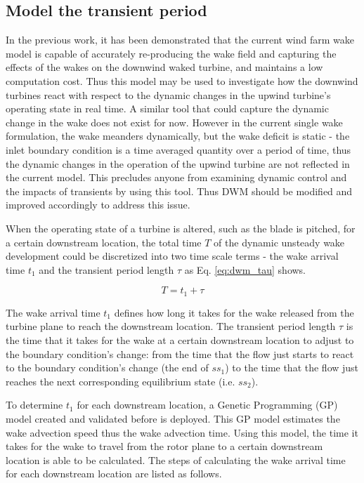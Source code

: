 \documentclass{umthesis}
\begin{document}
\subsection{Model the transient period}
In the previous work, it has been demonstrated that the current wind farm wake model is capable of accurately re-producing the wake field and capturing the effects of the wakes on the downwind waked turbine, and maintains a low computation cost. Thus this model may be used to investigate how the downwind turbines react with respect to the dynamic changes in the upwind turbine’s operating state in real time. A similar tool that could capture the dynamic change in the wake does not exist for now. However in the current single wake formulation, the wake meanders dynamically, but the wake deficit is static - the inlet boundary condition is a time averaged quantity over a period of time, thus the dynamic changes in the operation of the upwind turbine are not reflected in the current model. This precludes anyone from examining dynamic control and the impacts of transients by using this tool. Thus DWM should be modified and improved accordingly to address this issue.

When the operating state of a turbine is altered, such as the blade is pitched, for a certain downstream location, the total time $T$ of the dynamic unsteady wake development could be discretized into two time scale terms - the wake arrival time $t_1$ and the transient period length $\tau$ as Eq. \ref{eq:dwm_tau} shows. 

\begin{equation}\label{eq:dwm_tau}
  T = t_1 + \tau
\end{equation}

The wake arrival time $t_1$ defines how long it takes for the wake released from the turbine plane to reach the downstream location. The transient period length $\tau$ is the time that it takes for the wake at a certain downstream location to adjust to the boundary condition’s change: from the time that the flow just starts to react to the boundary condition’s change (the end of $ss_1$) to the time that the flow just reaches the next corresponding equilibrium state (i.e. $ss_2$).

To determine $t_1$ for each downstream location, a Genetic Programming (GP) model created and validated before is deployed. This GP model estimates the wake advection speed thus the wake advection time. Using this model, the time it takes for the wake to travel from the rotor plane to a certain downstream location is able to be calculated. The steps of calculating the wake arrival time for each downstream location are listed as follows.
\end{document}
